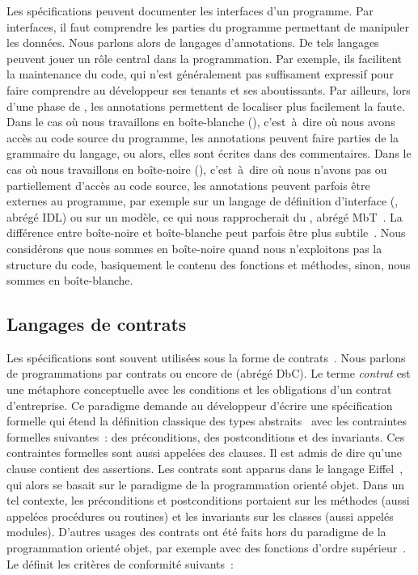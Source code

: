 Les spécifications peuvent documenter les {\strong interfaces} d'un programme.
Par interfaces, il faut comprendre les parties du programme permettant de
manipuler les données. Nous parlons alors de {\strong langages d'annotations}.
De tels langages peuvent jouer un rôle central dans la programmation. Par
exemple, ils facilitent la maintenance du code, qui n'est généralement pas
suffisament expressif pour faire comprendre au développeur ses tenants et ses
aboutissants. Par ailleurs, lors d'une phase de , les
annotations permettent de localiser plus facilement la faute. Dans le cas où
nous travaillons en boîte-blanche (), c'est~à~dire où nous
avons accès au code source du programme, les annotations peuvent faire parties
de la grammaire du langage, ou alors, elles sont écrites dans des {\strong
commentaires}. Dans le cas où nous travaillons en boîte-noire
(), c'est~à~dire où nous n'avons pas ou partiellement
d'accès au code source, les annotations peuvent parfois être externes au
programme, par exemple sur un langage de définition d'interface
(, abrégé IDL) ou sur un modèle, ce qui
nous rapprocherait du , abrégé
MbT~. La différence entre boîte-noire et boîte-blanche peut
parfois être plus subtile~.  Nous considérons que nous sommes en
boîte-noire quand nous n'exploitons pas la structure du code, basiquement le
contenu des fonctions et méthodes, sinon, nous sommes en boîte-blanche.

\subsection{Langages de contrats}
\label{subsection:sota:dbc}

Les spécifications sont souvent utilisées sous la forme de {\strong
contrats}~. Nous parlons de programmations par contrats
ou encore de  (abrégé DbC). Le terme {\em contrat}
est une métaphore conceptuelle avec les conditions et les obligations d'un
contrat d'entreprise. Ce paradigme demande au développeur d'écrire une
spécification formelle qui étend la définition classique des types
abstraits~ avec les contraintes formelles suivantes~: des
{\strong préconditions}, des {\strong postconditions} et des {\strong
invariants}. Ces contraintes formelles sont aussi appelées des {\strong
clauses}. Il est admis de dire qu'une clause contient des {\strong assertions}.
Les contrats sont apparus dans le langage Eiffel~, qui alors se
basait sur le paradigme de la programmation orienté objet. Dans un tel contexte,
les préconditions et postconditions portaient sur les méthodes (aussi appelées
procédures ou routines) et les invariants sur les classes (aussi appelés
modules). D'autres usages des contrats ont été faits hors du paradigme de la
programmation orienté objet, par exemple avec des fonctions d'ordre
supérieur~. Le  définit les
critères de conformité suivants~:

